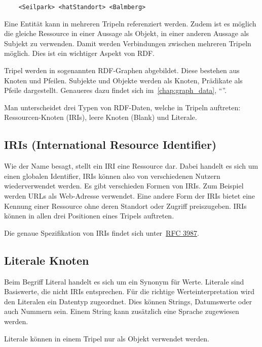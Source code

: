 \begin{lstlisting}
    <Seilpark> <hatStandort> <Balmberg>
\end{lstlisting}

Eine Entität kann in mehreren Tripeln referenziert werden. Zudem ist es möglich die gleiche Ressource in einer Aussage als Objekt, in einer anderen Aussage als Subjekt zu verwenden. Damit werden Verbindungen zwischen mehreren Tripeln möglich. Dies ist ein wichtiger Aspekt von RDF.\@

Tripel werden in sogenannten RDF-Graphen abgebildet. Diese bestehen aus Knoten und Pfeilen. Subjekte und Objekte werden als Knoten, Prädikate als Pfeile dargestellt. Genaueres dazu findet sich im~\autoref{chap:graph_data}, ``''.

Man unterscheidet drei Typen von RDF-Daten, welche in Tripeln auftreten: Ressourcen-Knoten (IRIs), leere Knoten (Blank) und Literale.

\subsection{IRIs (International Resource Identifier)}
\label{sec:rdf_rdf_dataModel_iris}
Wie der Name besagt, stellt ein IRI eine Ressource dar. Dabei handelt es sich um einen globalen Identifier, IRIs können also von verschiedenen Nutzern wiederverwendet werden. Es gibt verschieden Formen von IRIs. Zum Beispiel werden URLs als Web-Adresse verwendet. Eine andere Form der IRIs bietet eine Kennung einer Ressource ohne deren Standort oder Zugriff preiszugeben. IRIs können in allen drei Positionen eines Tripels auftreten.

Die genaue Spezifikation von IRIs findet sich unter~\href{http://www.ietf.org/rfc/rfc3987.txt}{RFC 3987}.

\subsection{Literale Knoten}
\label{sec:rdf_rdf_dataModel_literal}
Beim Begriff Literal handelt es sich um ein Synonym für Werte. Literale sind Basiswerte, die nicht IRIs entsprechen. Für die richtige Werteinterpretation wird den Literalen ein Datentyp zugeordnet. Dies können Strings, Datumswerte oder auch Nummern sein. Einem String kann zusätzlich eine Sprache zugewiesen werden.

Literale können in einem Tripel nur als Objekt verwendet werden.

